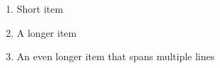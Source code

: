 \documentclass{beamer}
\newcommand{\adjustedbox}[1]{%
  \begin{varwidth}{\linewidth}%
    \begin{tcolorbox}[mybox]
      #1
    \end{tcolorbox}%
  \end{varwidth}%
}
\begin{document}
\begin{frame}
  \begin{enumerate}[label=\arabic*.]
    \item \adjustedbox{Short item}
    \item \adjustedbox{A longer item}
    \item \adjustedbox{An even longer item that spans multiple lines}
  \end{enumerate}
\end{frame}
\end{document}
